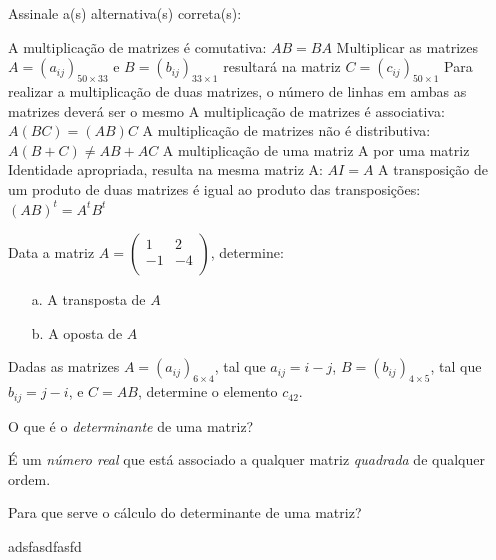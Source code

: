 \documentclass[pdftex, brazil, 12pt, oneside, addpoints]{exam}
\begin{document}
\begin{questions}
\question
Assinale a(s) alternativa(s) correta(s):
\begin{checkboxes}
  \choice A multiplicação de matrizes é comutativa: $AB = BA$
  \CorrectChoice Multiplicar as matrizes $A = (a_{ij})_{50 \times 33}$ e $B = (b_{ij})_{33 \times 1}$
  resultará na matriz $C = (c_{ij})_{50 \times 1}$
  \choice Para realizar a multiplicação de duas matrizes, o número de linhas
  em ambas as matrizes deverá ser o mesmo
  \CorrectChoice A multiplicação de matrizes é associativa: $A(BC) = (AB)C$
  \choice A multiplicação de matrizes não é distributiva: $A(B + C) \ne AB + AC$
  \CorrectChoice A multiplicação de uma matriz A por uma matriz Identidade apropriada,
  resulta na mesma matriz A: $AI = A$
  \CorrectChoice A transposição de um produto de duas matrizes é igual ao produto
  das transposições: $(AB)^t = A^tB^t$
\end{checkboxes}

\question
Data a matriz
$A = \begin{pmatrix}
  1 & 2\\
  -1 & -4\\
\end{pmatrix}$, determine:
\begin{itemize}
\item[a.] A transposta de $A$
\item[b.] A oposta de $A$
\end{itemize}

\question
Dadas as matrizes $A = (a_{ij})_{6 \times 4}$, tal que $a_{ij} = i - j$, $B = (b_{ij})_{4 \times 5}$,
tal que $b_{ij} = j - i$, e $C = AB$, determine o elemento $c_{42}$.



\question
O que é o \emph{determinante} de uma matriz?
\begin{solutionorlines}[0.75in]
  É um \emph{número real} que está associado a qualquer matriz \emph{quadrada}
  de qualquer ordem.
\end{solutionorlines}

\question
Para que serve o cálculo do determinante de uma matriz?
\begin{solutionorlines}[0.75in]
  adsfasdfasfd
\end{solutionorlines}


\end{questions}
\end{document}
